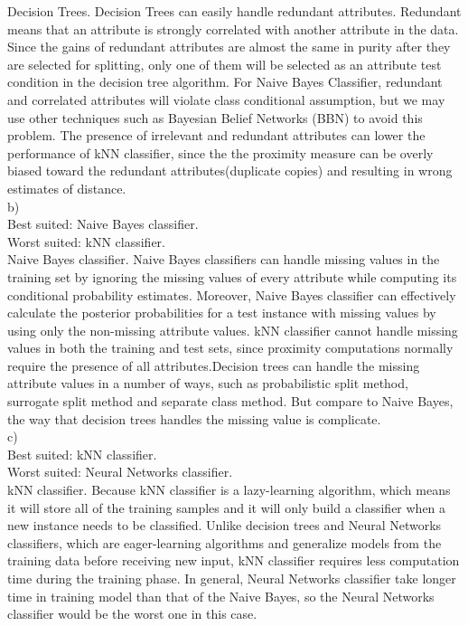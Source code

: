 \documentclass[12pt]{article}
\begin{document}
Decision Trees. Decision Trees can easily handle redundant attributes. Redundant means that an attribute is strongly correlated with another attribute in the data. Since the gains of redundant attributes are almost the same in purity after they are selected for splitting, only one of them will be selected as an attribute test condition in the decision tree algorithm. For Naive Bayes Classifier, redundant and correlated attributes will violate class conditional assumption, but we may use other techniques such as Bayesian Belief Networks (BBN) to avoid this problem. The presence of irrelevant and redundant attributes can lower the performance of kNN classifier, since the the proximity measure can be overly biased toward the redundant attributes(duplicate copies) and resulting in wrong estimates of distance.\\

b)\\

Best suited: Naive Bayes classifier.\\

Worst suited: kNN classifier.\\

Naive Bayes classifier. Naive Bayes classifiers can handle missing values in the training set by ignoring the missing values of every attribute while computing its conditional probability estimates. Moreover, Naive Bayes classifier can effectively calculate the posterior probabilities for a test instance with missing values by using only the non-missing attribute values. kNN classifier cannot
handle missing values in both the training and test sets, since proximity computations normally require the presence of all attributes.Decision trees can handle the missing attribute values in a number of ways, such as probabilistic split method, surrogate split method and separate class method. But compare to Naive Bayes, the way that decision trees handles the missing value is complicate.\\

c)\\

Best suited: kNN classifier.\\

Worst suited: Neural Networks classifier.\\

kNN classifier. Because kNN classifier is a lazy-learning algorithm, which means it will store all of the training samples and it will only build a classifier when a new instance needs to be classified. Unlike decision trees and Neural Networks classifiers, which are eager-learning algorithms and generalize models from the training data before receiving new input, kNN classifier requires
less computation time during the training phase. In general, Neural Networks classifier take longer time in training model than that of the Naive Bayes, so the Neural Networks classifier would be the worst one in this case. 
\end{document}
